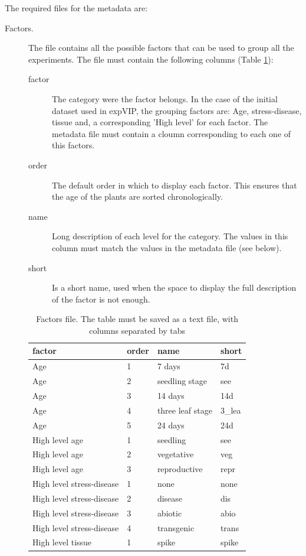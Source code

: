 The required files for the metadata are:
\begin{description}
\item[Factors.] The file contains all the possible factors that can be used to group all the experiments. The file must contain the following columns (Table \ref{tab:exp:factors}):
\begin{description}
\item[factor] The category were the factor belongs. In the case of the initial dataset used in expVIP, the grouping factors are: Age, stress-disease, tissue and, a corresponding 'High level' for each factor. The metadata file must contain a cloumn corresponding to each one of this factors. 
\item[order] The default order in which to display each factor. This ensures that the age of the plants are sorted chronologically. 
\item[name] Long description of each level for the category. The values in this column must match the values in the metadata file (see below).   
\item[short] Is a short name, used when the space to display the full description of the factor is not enough.
\end{description}
\begin{table}
\centering
\caption[Factors file]{Factors file. The table must be saved as a text file, with columns separated by tabs}
\label{tab:exp:factors}
\begin{tabular}{llll}
\toprule
factor & order & name & short \\
\midrule
Age & 1 & 7 days & 7d \\
Age & 2 & seedling stage & see \\
Age & 3 & 14 days & 14d \\
Age & 4 & three leaf stage & 3\_lea \\
Age & 5 & 24 days & 24d \\
High level age & 1 & seedling & see \\
High level age & 2 & vegetative & veg \\
High level age & 3 & reproductive & repr \\
High level stress-disease & 1 & none & none \\
High level stress-disease & 2 & disease & dis \\
High level stress-disease & 3 & abiotic & abio \\
High level stress-disease & 4 & transgenic & trans \\
High level tissue & 1 & spike & spike \\

\end{tabular}
\end{table}
\end{description}
